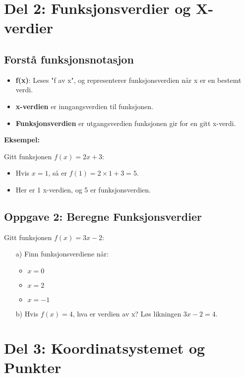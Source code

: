 \documentclass[12pt]{article}
\begin{document}
\section*{Del 2: Funksjonsverdier og X-verdier}

\subsection*{Forstå funksjonsnotasjon}

\begin{itemize}
    \item \textbf{f(x)}: Leses "f av x", og representerer funksjonsverdien når x er en bestemt verdi.
    \item \textbf{x-verdien} er inngangsverdien til funksjonen.
    \item \textbf{Funksjonsverdien} er utgangsverdien funksjonen gir for en gitt x-verdi.
\end{itemize}

\textbf{Eksempel:}

Gitt funksjonen \( f(x) = 2x + 3 \):

\begin{itemize}
    \item Hvis \( x = 1 \), så er \( f(1) = 2 \times 1 + 3 = 5 \).
    \item Her er 1 x-verdien, og 5 er funksjonsverdien.
\end{itemize}

\subsection*{Oppgave 2: Beregne Funksjonsverdier}

Gitt funksjonen \( f(x) = 3x - 2 \):

\begin{enumerate}
    \item[a)] Finn funksjonsverdiene når:
    \begin{itemize}
        \item \( x = 0 \)
        \item \( x = 2 \)
        \item \( x = -1 \)
    \end{itemize}
    \item[b)] Hvis \( f(x) = 4 \), hva er verdien av x? Løs likningen \( 3x - 2 = 4 \).
\end{enumerate}

\section*{Del 3: Koordinatsystemet og Punkter}
\end{document}
